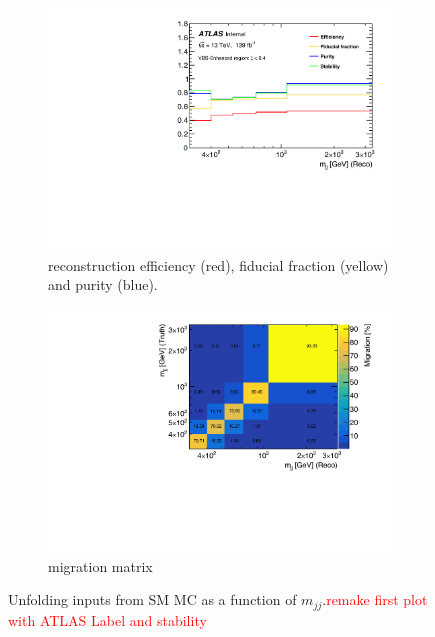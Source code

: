 \begin{figure}[htb]
    \centering
    \begin{subfigure}{.48\textwidth}
        \centering
        \includegraphics[width=.9\linewidth]{figures/Analysis/Unfolding/efficiencies_VBS_Enhanced.pdf}
        \caption{ reconstruction efficiency (red), fiducial fraction (yellow) and purity (blue). }
    \end{subfigure}
    \begin{subfigure}{.48\textwidth}
        \centering
        \includegraphics[width=.9\linewidth]{figures/Analysis/Unfolding/migration_matrix_VBS_Enhanced.pdf}
        \caption{migration matrix}
    \end{subfigure}
    \caption{ Unfolding inputs from SM MC as a function of $m_{jj}$.\textcolor{red}{remake first plot with ATLAS Label and stability} \label{fig:UnfoldingInputs}}
\end{figure}

